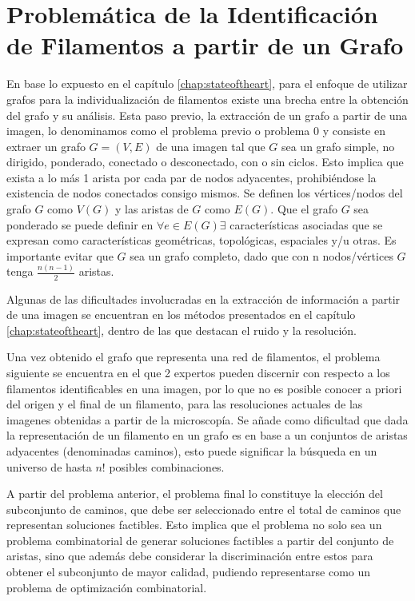 \chapter{Problem\'atica de la Identificaci\'on de Filamentos a partir de un Grafo}
\label{chap:cap2}


En base lo expuesto en el cap\'itulo \ref{chap:stateoftheart}, para el enfoque de utilizar grafos para la individualizaci\'on de filamentos existe una brecha entre la obtenci\'on del grafo y su an\'alisis. Esta paso previo, la extracci\'on de un grafo a partir de una imagen, lo denominamos como el problema previo o problema 0 y consiste en extraer un grafo $G = (V,E)$ de una imagen tal que $G$ sea un grafo simple, no dirigido, ponderado, conectado o desconectado, con o sin ciclos. Esto implica que exista a lo m\'as 1 arista por cada par de nodos adyacentes, prohibi\'endose la existencia de nodos conectados consigo mismos. Se definen los v\'ertices/nodos del grafo $G$ como $V(G)$ y las aristas de $G$ como $E(G)$. 
Que el grafo $G$ sea ponderado se puede definir en $\forall e \in E(G)  \exists $ caracter\'isticas asociadas que se expresan como caracter\'isticas geom\'etricas, topol\'ogicas, espaciales y/u otras. Es importante evitar que $G$ sea un grafo completo, dado que con n nodos/v\'ertices $G$ tenga $\frac{n(n-1)}{2}$ aristas. 

Algunas de las dificultades involucradas en la extracci\'on de informaci\'on a partir de una imagen se encuentran en los m\'etodos presentados en el cap\'itulo \ref{chap:stateoftheart}, dentro de las que destacan el ruido y la resoluci\'on.

Una vez obtenido el grafo que representa una red de filamentos, el problema siguiente se encuentra en el que 2 expertos pueden discernir con respecto a los filamentos identificables en una imagen, por lo que no es posible conocer a priori del origen y el final de un filamento, para las resoluciones actuales de las imagenes obtenidas a partir de la microscop\'ia. Se añade como dificultad que dada la representaci\'on de un filamento en un grafo es en base a un conjuntos de aristas adyacentes (denominadas caminos), esto puede significar la b\'usqueda en un universo de hasta $n!$ posibles combinaciones.

A partir del problema anterior, el problema final lo constituye la elecci\'on del subconjunto de caminos, que debe ser seleccionado entre el total de caminos que representan soluciones factibles. Esto implica que el problema no solo sea un problema combinatorial de generar soluciones factibles a partir del conjunto de aristas, sino que adem\'as debe considerar la discriminaci\'on entre estos para obtener el subconjunto de mayor calidad, pudiendo representarse como un problema de optimizaci\'on combinatorial.

